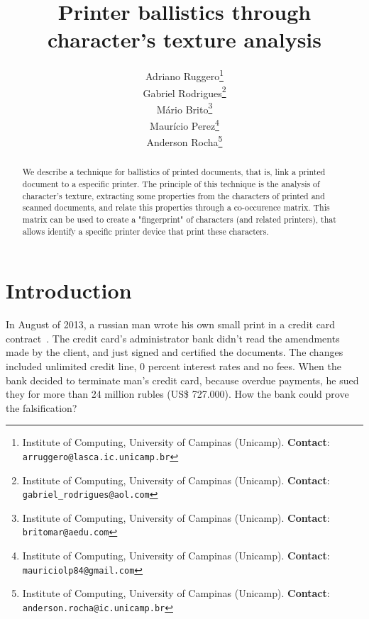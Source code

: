 \documentclass[10pt,twocolumn,letterpaper]{article}
\begin{document}
\title{Printer ballistics through character's texture analysis}
\author{Adriano Ruggero\thanks{Institute of Computing, University of Campinas (Unicamp). \textbf{Contact}: \tt\small{arruggero@lasca.ic.unicamp.br}}\\
Gabriel Rodrigues\thanks{Institute of Computing, University of Campinas (Unicamp). \textbf{Contact}: \tt\small{gabriel\_rodrigues@aol.com}}\\
Mário Brito\thanks{Institute of Computing, University of Campinas (Unicamp). \textbf{Contact}:
\tt\small{britomar@aedu.com}}\\
Maurício Perez\thanks{Institute of Computing, University of Campinas (Unicamp). \textbf{Contact}:
\tt\small{mauriciolp84@gmail.com}}\\
Anderson Rocha\thanks{Institute of Computing, University of Campinas (Unicamp). \textbf{Contact}: \tt\small{anderson.rocha@ic.unicamp.br}}
}

\maketitle
\begin{abstract}
We describe a technique for ballistics of printed documents, that is, link a printed document to a especific printer. The principle of this technique is the analysis of character's texture, extracting some properties from the characters of printed and scanned documents, and relate this properties through a co-occurence matrix. This matrix can be used to create a "fingerprint" of characters (and related printers), that allows identify a specific printer device that print these characters.
\end{abstract}

\section{Introduction}
In August of 2013, a russian man wrote his own small print in a credit card contract~\cite{RT}. The credit card's administrator bank didn't read the amendments made by the client, and just signed and certified the documents. The changes included unlimited credit line, 0 percent interest rates and no fees. When the bank decided to terminate man's credit card, because overdue payments, he sued they for more than 24 million rubles (US\$ 727.000). How the bank could prove the falsification?
\end{document}
